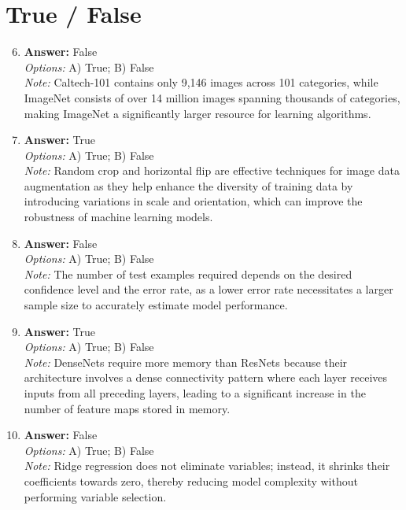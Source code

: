 \documentclass[12pt]{article}
\begin{document}
\section*{True / False}
\begin{enumerate}[label=\arabic*.]
\setcounter{enumi}{5}
\item \textbf{Answer:} False
\\ \textit{Options:} A) True; B) False
\\ \textit{Note:} Caltech-101 contains only 9,146 images across 101 categories, while ImageNet consists of over 14 million images spanning thousands of categories, making ImageNet a significantly larger resource for learning algorithms.
\item \textbf{Answer:} True
\\ \textit{Options:} A) True; B) False
\\ \textit{Note:} Random crop and horizontal flip are effective techniques for image data augmentation as they help enhance the diversity of training data by introducing variations in scale and orientation, which can improve the robustness of machine learning models.
\item \textbf{Answer:} False
\\ \textit{Options:} A) True; B) False
\\ \textit{Note:} The number of test examples required depends on the desired confidence level and the error rate, as a lower error rate necessitates a larger sample size to accurately estimate model performance.
\item \textbf{Answer:} True
\\ \textit{Options:} A) True; B) False
\\ \textit{Note:} DenseNets require more memory than ResNets because their architecture involves a dense connectivity pattern where each layer receives inputs from all preceding layers, leading to a significant increase in the number of feature maps stored in memory.
\item \textbf{Answer:} False
\\ \textit{Options:} A) True; B) False
\\ \textit{Note:} Ridge regression does not eliminate variables; instead, it shrinks their coefficients towards zero, thereby reducing model complexity without performing variable selection.
\end{enumerate}
\end{document}
